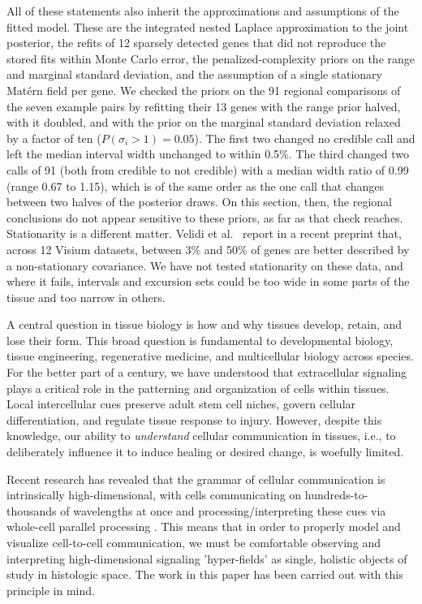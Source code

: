 \documentclass[10pt,letterpaper]{article}
\begin{document}
All of these statements also inherit the approximations and assumptions of the fitted model. These are the integrated nested Laplace approximation to the joint posterior, the refits of 12 sparsely detected genes that did not reproduce the stored fits within Monte Carlo error, the penalized-complexity priors on the range and marginal standard deviation, and the assumption of a single stationary Mat\'ern field per gene. We checked the priors on the 91 regional comparisons of the seven example pairs by refitting their 13 genes with the range prior halved, with it doubled, and with the prior on the marginal standard deviation relaxed by a factor of ten ($P(\sigma_i > 1) = 0.05$). The first two changed no credible call and left the median interval width unchanged to within 0.5\%. The third changed two calls of 91 (both from credible to not credible) with a median width ratio of 0.99 (range 0.67 to 1.15), which is of the same order as the one call that changes between two halves of the posterior draws. On this section, then, the regional conclusions do not appear sensitive to these priors, as far as that check reaches. Stationarity is a different matter. Velidi et al.\ \cite{velidi2026nonstationarity} report in a recent preprint that, across 12 Visium datasets, between 3\% and 50\% of genes are better described by a non-stationary covariance. We have not tested stationarity on these data, and where it fails, intervals and excursion sets could be too wide in some parts of the tissue and too narrow in others.

A central question in tissue biology is how and why tissues develop, retain, and lose their form. This broad question is fundamental to developmental biology, tissue engineering, regenerative medicine, and multicellular biology across species. For the better part of a century, we have understood that extracellular signaling plays a critical role in the patterning and organization of cells within tissues. Local intercellular cues preserve adult stem cell niches, govern cellular differentiation, and regulate tissue response to injury. However, despite this knowledge, our ability to \textit{understand} cellular communication in tissues, i.e., to deliberately influence it to induce healing or desired change, is woefully limited.

Recent research has revealed that the grammar of cellular communication is intrinsically high-dimensional, with cells communicating on hundreds-to-thousands of wavelengths at once and processing/interpreting these cues via whole-cell parallel processing \cite{Granados2024}. This means that in order to properly model and visualize cell-to-cell communication, we must be comfortable observing and interpreting high-dimensional signaling 'hyper-fields' as single, holistic objects of study in histologic space. The work in this paper has been carried out with this principle in mind.
\end{document}

